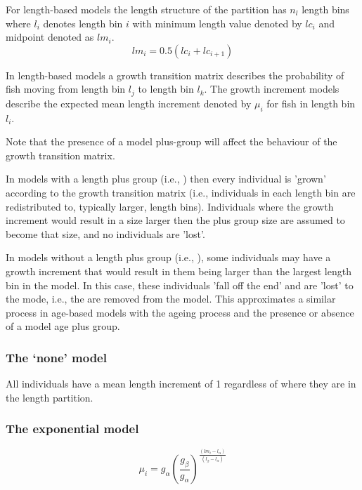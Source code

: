For length-based models the length structure of the partition has \(n_l\) length bins where \(l_i\) denotes length bin \(i\) with minimum length value denoted by \(lc_i\) and midpoint denoted as \(lm_i\).
\[lm_i = 0.5 \left(lc_i + lc_{i+1}\right)\]

In length-based models a growth transition matrix describes the probability of fish moving from length bin \(l_j\) to length bin \(l_k\). The growth increment models describe the expected mean length increment denoted by \(\mu_i\) for fish in length bin \(l_i\).

Note that the presence of a model plus-group will affect the behaviour of the growth transition matrix. 

In models with a length plus group (i.e., ) then every individual is 'grown' according to the growth transition matrix (i.e., individuals in each length bin are redistributed to, typically larger, length bins). Individuals where the growth increment would result in a size larger then the plus group size are assumed to become that size, and no individuals are 'lost'. 

In models without a length plus group (i.e., ), some individuals may have a growth increment that would result in them being larger than the largest length bin in the model. In this case, these individuals 'fall off the end' and are 'lost' to the mode, i.e., the are removed from the model. This approximates a similar process in age-based models with the ageing process and the presence or absence of a model age plus group. 

\subsubsection{The `none' model}\label{sec:GrowthIncrement-None}

All individuals have a mean length increment of 1 regardless of where they are in the length partition.

\subsubsection{The exponential model}\label{sec:GrowthIncrement-Exponential}

\begin{equation}
\mu_i = g_\alpha \left(\frac{g_\beta}{g_\alpha} \right)^{\frac{(lm_i - l_\alpha)}{(l_\beta - l_\alpha)}}
\end{equation}

